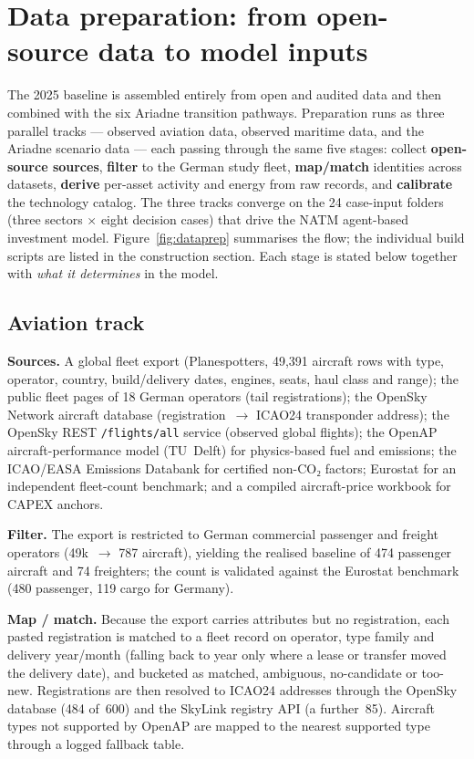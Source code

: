 \documentclass[11pt,a4paper]{article}
\begin{document}
\section*{Data preparation: from open-source data to model inputs}

The 2025 baseline is assembled entirely from open and audited data and then combined with the six Ariadne transition pathways. Preparation runs as three parallel tracks --- observed aviation data, observed maritime data, and the Ariadne scenario data --- each passing through the same five stages: collect \textbf{open-source sources}, \textbf{filter} to the German study fleet, \textbf{map/match} identities across datasets, \textbf{derive} per-asset activity and energy from raw records, and \textbf{calibrate} the technology catalog. The three tracks converge on the 24 case-input folders (three sectors $\times$ eight decision cases) that drive the NATM agent-based investment model. Figure~\ref{fig:dataprep} summarises the flow; the individual build scripts are listed in the construction section. Each stage is stated below together with \emph{what it determines} in the model.

\subsection*{Aviation track}

\textbf{Sources.} A global fleet export (Planespotters, 49{,}391 aircraft rows with type, operator, country, build/delivery dates, engines, seats, haul class and range); the public fleet pages of 18 German operators (tail registrations); the OpenSky Network aircraft database (registration~$\rightarrow$ ICAO24 transponder address); the OpenSky REST \texttt{/flights/all} service (observed global flights); the OpenAP aircraft-performance model (TU~Delft) for physics-based fuel and emissions; the ICAO/EASA Emissions Databank for certified non-CO₂ factors; Eurostat for an independent fleet-count benchmark; and a compiled aircraft-price workbook for CAPEX anchors.

\textbf{Filter.} The export is restricted to German commercial passenger and freight operators (49k~$\rightarrow$ 787 aircraft), yielding the realised baseline of 474 passenger aircraft and 74 freighters; the count is validated against the Eurostat benchmark (480 passenger, 119 cargo for Germany).

\textbf{Map / match.} Because the export carries attributes but no registration, each pasted registration is matched to a fleet record on operator, type family and delivery year/month (falling back to year only where a lease or transfer moved the delivery date), and bucketed as matched, ambiguous, no-candidate or too-new. Registrations are then resolved to ICAO24 addresses through the OpenSky database (484 of~600) and the SkyLink registry API (a further~85). Aircraft types not supported by OpenAP are mapped to the nearest supported type through a logged fallback table.
\end{document}
